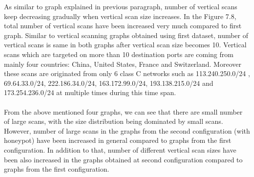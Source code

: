 As similar to graph explained in previous paragraph, number of vertical scans keep decreasing gradually when vertical scan size increases.
In the Figure 7.8, total number of vertical scans have been increased very much compared to first graph.
Similar to vertical scanning graphs obtained using first dataset, number of vertical scans is same in both graphs after vertical scan size becomes 10.
Vertical scans which are targeted on more than 10 destination ports are coming from mainly four countries: China, United States, France and Switzerland.
Moreover these scans are originated from only 6 class C networks such as 113.240.250.0/24 , 69.64.33.0/24, 222.186.34.0/24, 163.172.99.0/24, 193.138.215.0/24 and 173.254.236.0/24 at multiple times during this time span.\\\\ 
From the above mentioned four graphs,  we can see that there are small number
of large scans, with the size distribution being dominated by small scans.
However, number of large scans in the graphs from the second configuration (with honeypot) have been increased in general compared to graphs from the first configuration.
In addition to that, number of different vertical scan sizes have been also increased in the graphs obtained at second configuration compared to graphs from the first configuration.
